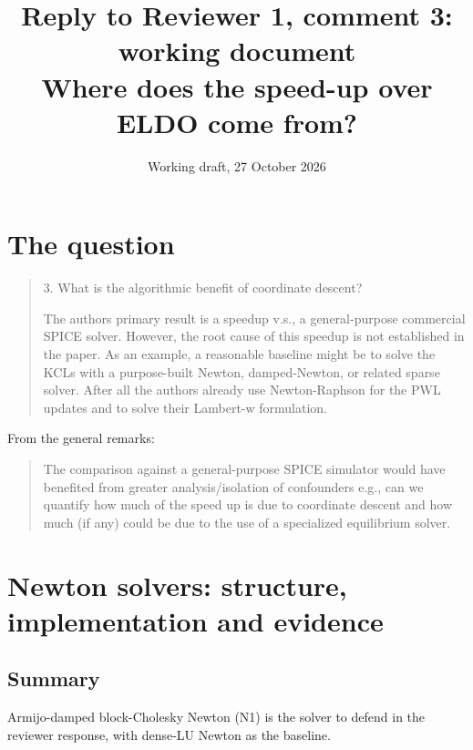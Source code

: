 \documentclass[11pt,a4paper]{article}
\title{Reply to Reviewer 1, comment 3: working document\\[0.5em]
\large Where does the speed-up over ELDO come from?}
\author{}
\date{Working draft, 27 October 2026}
\newenvironment{reviewercomment}
  {\begin{quote}\small\color{black}}
  {\end{quote}}
\begin{document}
\maketitle

\section*{The question}

\begin{reviewercomment}
3. What is the algorithmic benefit of coordinate descent?

The authors primary result is a speedup v.s., a general-purpose commercial
SPICE solver. However, the root cause of this speedup is not established
in the paper. As an example, a reasonable baseline might be to solve the
KCLs with a purpose-built Newton, damped-Newton, or related sparse solver.
After all the authors already use Newton-Raphson for the PWL updates and
to solve their Lambert-w formulation.
\end{reviewercomment}

From the general remarks:

\begin{reviewercomment}
The comparison against a general-purpose SPICE simulator would have
benefited from greater analysis/isolation of confounders e.g., can we
quantify how much of the speed up is due to coordinate descent and how
much (if any) could be due to the use of a specialized equilibrium solver.
\end{reviewercomment}


\section*{Newton solvers: structure, implementation and evidence}

\subsection*{Summary}

Armijo-damped block-Cholesky Newton (N1) is the solver to defend in the reviewer
response, with dense-LU Newton as the baseline.
\end{document}
